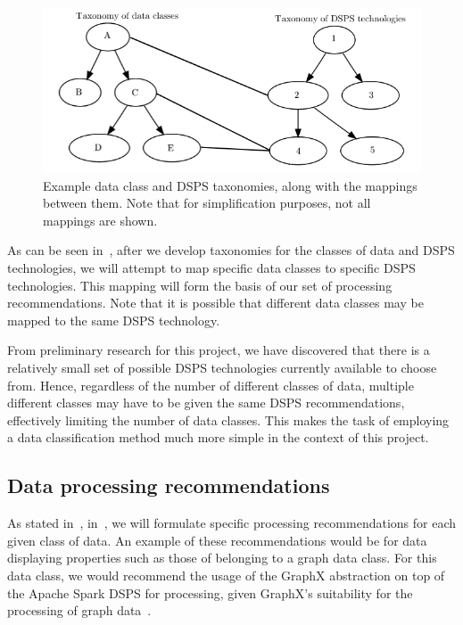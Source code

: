 \documentclass[a4paper,11pt]{article}
\begin{document}
\begin{figure}[ht]
  \centering
  \includegraphics[scale=0.5]{img/taxonomy.png}
  \caption{Example data class and DSPS taxonomies, along with the mappings between them. Note that for simplification
  purposes, not all mappings are shown.}
\label{fig:taxonomy}
\end{figure}

As can be seen in~, after we develop taxonomies for the classes of data and DSPS technologies, we
will attempt to map specific data classes to specific DSPS technologies. This mapping will form the basis of our set of
processing recommendations. Note that it is possible that different data classes may be mapped to the same DSPS technology.

From preliminary research for this project, we have discovered that there is a relatively small set of possible DSPS
technologies currently available to choose from. Hence, regardless of the number of different classes of data, multiple
different classes may have to be given the same DSPS recommendations, effectively limiting the number of data
classes. This makes the task of employing a data classification method much more simple in the context of this project.


\subsection{Data processing recommendations} %
\label{sub:data_processing_recommendations}

As stated in~, in~, we will formulate specific processing
recommendations for each given class of data. An example of these recommendations would be for data displaying
properties such as those of belonging to a graph data class. For this data class, we would recommend the usage of the
GraphX abstraction on top of the Apache Spark DSPS for processing, given GraphX's suitability for the processing of
graph data~\cite{DBLP:journals/corr/XinCDGFS14}.
\end{document}
